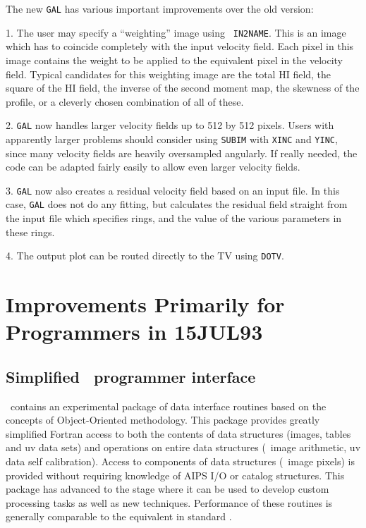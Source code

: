 The new {\tt GAL} has various important improvements over the old
version:
\begin{description}
\item{1.} The user may specify a ``weighting'' image using \hbox{{\tt
IN2NAME}}.  This is an image which has to coincide completely with the
input velocity field.  Each pixel in this image contains the weight to
be applied to the equivalent pixel in the velocity field.  Typical
candidates for this weighting image are the total HI field, the square
of the HI field, the inverse of the second moment map, the skewness of
the profile, or a cleverly chosen combination of all of these.

\item{2.} {\tt GAL} now handles larger velocity fields up to 512 by
512 pixels. Users with apparently larger problems should consider
using {\tt SUBIM} with {\tt XINC} and {\tt YINC}, since many velocity
fields are heavily oversampled angularly.  If really needed, the code
can be adapted fairly easily to allow even larger velocity fields.

\item{3.} {\tt GAL} now also creates a residual velocity field based
on an input file.  In this case, {\tt GAL} does not do any fitting,
but calculates the residual field straight from the input file which
specifies rings, and the value of the various parameters in these
rings.

\item{4.} The output plot can be routed directly to the TV using
\hbox{{\tt DOTV}}.
\end{description}

\section{Improvements Primarily for Programmers in 15JUL93}

\subsection{Simplified \AIPS\ programmer interface}

   \AIPS\ contains an experimental package of data interface routines
based on the concepts of Object-Oriented methodology.  This package
provides greatly simplified Fortran access to both the contents of
data structures (images, tables and uv data sets) and operations on
entire data structures  (\eg\ image arithmetic, uv data self
calibration).  Access to components of data structures (\eg\ image
pixels) is provided without requiring knowledge of AIPS I/O or catalog
structures.   This package has advanced to the stage where it can be
used to develop custom processing tasks as well as new techniques.
Performance of these routines is generally comparable to the
equivalent in standard \hbox{{\AIPS}}.

